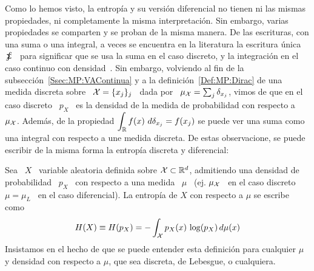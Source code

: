 Como lo hemos  visto, la entrop\'ia y su versi\'on diferencial  no tienen ni las
mismas  propiedades, ni  completamente la  misma interpretaci\'on.  Sin embargo,
varias  propiedades  se  comparten y  se  proban  de  la  misma manera.  De  las
escrituras, con una  suma o una integral, a veces se  encuentra en la literatura
la escritura \'unica \ $\sumint$ \ para significar que se usa la suma en el caso
discreto, y la integraci\'on en el caso continuo con densidad~\cite{Rio07}.  Sin
embargo,   volviendo  al   fin   de  la   subsecci\'on~\ref{Ssec:MP:VAContinua}
y a la  definici\'on~\ref{Def:MP:Dirac} de una medida discreta sobre  \ $\mathcal{X} = \{
x_j \}_j$ \ dada  por \ $\mu_{\mathcal{X}} = \sum_j \delta_{x_j}$, vimos  de que en el caso
discreto \ $p_X$ \  es la densidad de la medida de  probabilidad con respecto a \
$\mu_{\mathcal{X}}$.   Adem\'as,   de  la   propiedad  $\displaystyle  \int_{\mathbb{R}}   f(x)  \
d\delta_{x_j} =  f(x_j)$ se puede ver una  suma como una integral  con respecto a
une medida discreta.  De estas observacione, se puede escribir de la misma forma
la entrop\'ia discreta y diferencial:
%
\begin{definicion}
\label{Def:SZ:ShanonMu}
%
Sea \ $X$ \ variable aleatoria definida sobre $\mathcal{X} \subset \mathbb{R}^d$, admitiendo
una  densidad de  probabilidad \  $p_X$ \  con respecto  a una  medida \  $\mu$ \
(ej.  $\mu_{\mathcal{X}}$  \  en   el  caso  discreto  \  $\mu  =  \mu_L$   \  en  el  caso
diferencial). La entrop\'ia de $X$ con respecto a $\mu$ se escribe como
  \[
  H(X) \equiv H(p_X) = - \int_{\mathcal{X}} p_X(x) \, \log(p_X) \, d\mu(x)
  \]
  Insistamos  en  el hecho  de  que se  puede  entender  esta definici\'on  para
  cualquier $\mu$ y densidad con respecto a $\mu$, que sea discreta, de Lebesgue,
  o cualquiera.
\end{definicion}